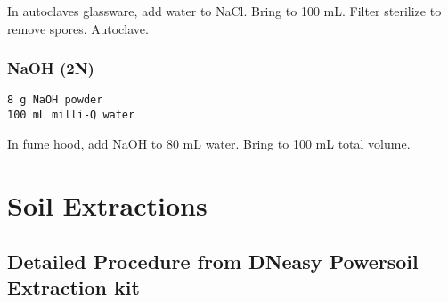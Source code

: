 \documentclass[
]{book}
\begin{document}
In autoclaves glassware, add water to NaCl. Bring to 100 mL. Filter sterilize to remove spores. Autoclave.

\hypertarget{naoh-2n}{%
\subsection{NaOH (2N)}\label{naoh-2n}}

\begin{verbatim}
8 g NaOH powder
100 mL milli-Q water
\end{verbatim}

In fume hood, add NaOH to 80 mL water. Bring to 100 mL total volume.

\hypertarget{soil-extractions}{%
\chapter{Soil Extractions}\label{soil-extractions}}

\hypertarget{detailed-procedure-from-dneasy-powersoil-extraction-kit}{%
\section{Detailed Procedure from DNeasy Powersoil Extraction kit}\label{detailed-procedure-from-dneasy-powersoil-extraction-kit}}
\end{document}
